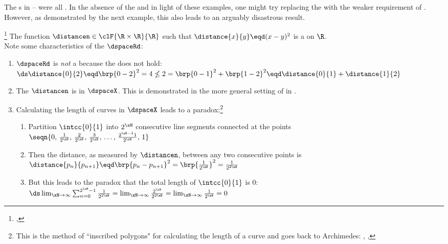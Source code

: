 The s in -- were all .
In the absence of the  and in light of these examples, 
one might try replacing the  with the weaker requirement of .
However, as demonstrated by the next example, this also leads to an arguably disastrous result.
\begin{example}
\footnote{
  ,
  }
\label{ex:dspace_xy2}
The function $\distancen\in\clF{\R\times\R}{\R}$ such that $\distance{x}{y}\eqd(x-y)^2$ is a  on $\R$.
\\Note some characteristics of the  $\dspaceRd$:
\begin{enumerate}
  \item $\dspaceRd$ is \emph{not} a  because the  does not hold:
    \\\indentx$\ds\distance{0}{2} \eqd \brp{0-2}^2 = 4 \nleq 2 = \brp{0-1}^2 + \brp{1-2}^2 \eqd \distance{0}{1} + \distance{1}{2} $

  \item The  $\distancen$ is  in $\dspaceX$.
        This is demonstrated in the more general setting of  in .

  \item Calculating the length of curves in $\dspaceX$ leads to a paradox:\footnote{
        This is the method of ``inscribed polygons" for calculating the length of a curve and goes back to Archimedes:
        ,
        ,
        }
    \begin{enumerate}
      \item Partition $\intcc{0}{1}$ into $2^\xN$ consecutive line segments connected at the points 
            \\\indentx$\seqn{0,\,\frac{1}{2^\xN},\,\frac{2}{2^\xN},\,\frac{3}{2^\xN},\,\ldots,\,\frac{2^{\xN-1}1}{2^\xN},\,1}$
      \item Then the distance, as measured by $\distancen$, between any two consecutive points is
            \\\indentx$\distance{p_n}{p_{n+1}}\eqd\brp{p_n-p_{n+1}}^2=\brp{\frac{1}{2^\xN}}^2=\frac{1}{2^{2\xN}}$
      \item But this leads to the paradox that the total length of $\intcc{0}{1}$ is 0:
            \\\indentx$\ds %
              \lim_{\xN\to\infty}\sum_{n=0}^{2^{\xN}-1}\frac{1}{2^{2\xN}}
              =\lim_{\xN\to\infty}\frac{2^\xN}{2^{2\xN}}
              =\lim_{\xN\to\infty}\frac{1}{2^{\xN}}
              =0
             $
    \end{enumerate}
\end{enumerate}
\end{example}

